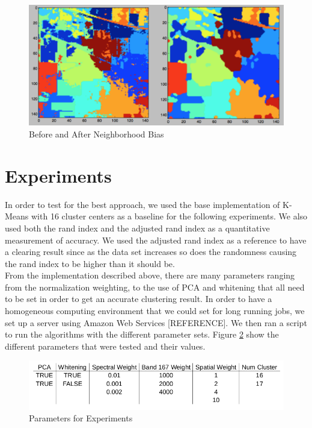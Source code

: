 \documentclass[journal]{IEEEtran}
\begin{document}
    \begin{figure}[h!]
      \centering\includegraphics[width=\columnwidth]{images/BandUnB.png}
      \caption{Before and After Neighborhood Bias}
      \label{fig:NeighborhoodBias}
    \end{figure}

\section{Experiments}
  In order to test for the best approach, we used the base implementation of K-Means with 16 cluster centers as a baseline for the following experiments. We also used both the rand index and the adjusted rand index as a quantitative measurement of accuracy. We used the adjusted rand index as a reference to have a clearing result since as the data set increases so does the randomness causing the rand index to be higher than it should be.\\

  From the implementation described above, there are many parameters ranging from the normalization weighting, to the use of PCA and whitening that all need to be set in order to get an accurate clustering result. In order to have a homogeneous computing environment that we could set for long running jobs, we set up a server using Amazon Web Services [REFERENCE]. We then ran a script to run the algorithms with the different parameter sets. Figure \ref{fig:Parameters} show the different parameters that were tested and their values.\\

  \begin{figure}[h!]
    \centering\includegraphics[width=\columnwidth]{images/parameters.png}
    \caption{Parameters for Experiments}
    \label{fig:Parameters}
  \end{figure}
\end{document}
